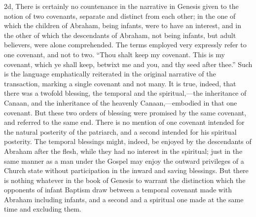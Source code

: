 \documentclass[]{book}
\begin{document}
2d, There is certainly no countenance in the narrative in Genesis given to the notion of two covenants, separate and distinct from each other; in the one of which the children of Abraham, being infants, were to have an interest, and in the other of which the descendants of Abraham, not being infants, but adult believers, were alone comprehended. The terms employed very expressly refer to one covenant, and not to two. ``Thou shalt keep my covenant. This is my covenant, which ye shall keep, betwixt me and you, and thy seed after thee.'' Such is the language emphatically reiterated in the original narrative of the transaction, marking a single covenant and not many. It is true, indeed, that there was a twofold blessing, the temporal and the spiritual,---the inheritance of Canaan, and the inheritance of the heavenly Canaan,---embodied in that one covenant. But these two orders of blessing were promised by the same covenant, and referred to the same end. There is no mention of one covenant intended for the natural posterity of the patriarch, and a second intended for his spiritual posterity. The temporal blessings might, indeed, be enjoyed by the descendants of Abraham after the flesh, while they had no interest in the spiritual; just in the same manner as a man under the Gospel may enjoy the outward privileges of a Church state without participation in the inward and saving blessings. But there is nothing whatever in the book of Genesis to warrant the distinction which the opponents of infant Baptism draw between a temporal covenant made with Abraham including infants, and a second and a spiritual one made at the same time and excluding them.
\end{document}
